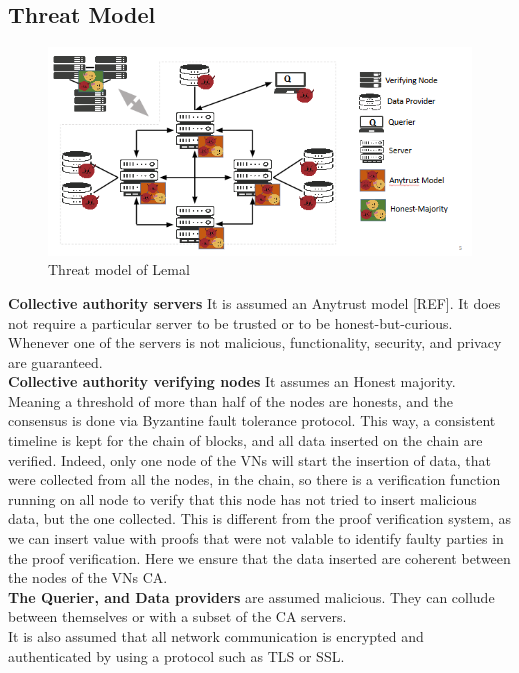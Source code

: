 \documentclass{article}
\begin{document}
\subsection{Threat Model}
\begin{figure}[H]
\center
\includegraphics[scale=0.75]{img/threatLemal.png}
\caption{Threat model of Lemal}
\end{figure}
\textbf{Collective authority servers} It is assumed an Anytrust model [REF]. It does not require a particular server to be trusted or to be honest-but-curious. Whenever one of the servers is not malicious, functionality, security, and privacy are guaranteed.\\
\textbf{Collective authority verifying nodes} It assumes an Honest majority. Meaning a threshold of more than half of the nodes are honests, and the consensus is done via Byzantine fault tolerance protocol. This way, a consistent timeline is kept for the chain of blocks, and all data inserted on the chain are verified. Indeed, only one node of the VNs will start the insertion of data, that were collected from all the nodes, in the chain, so there is a verification function running on all node to verify that this node has not tried to insert  malicious data, but the one collected. This is different from the proof verification system, as we can insert value with proofs that were not valable to identify faulty parties in the proof verification. Here we ensure that the data inserted are coherent between the nodes of the VNs CA.\\
\textbf{The Querier, and Data providers} are assumed malicious. They can collude between themselves or with a subset of the CA servers.\\
It is also assumed that all network communication is encrypted and authenticated by using a protocol such as TLS or SSL.
\end{document}
